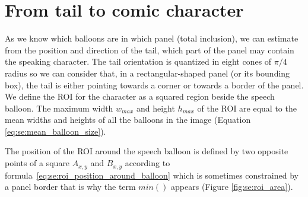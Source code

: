 


\section{From tail to comic character} %
\label{sec:se:tail_to_character}



As we know which balloons are in which panel (total inclusion), we can estimate from the position and direction of the tail, which part of the panel may contain the speaking character.
The tail orientation is quantized in eight cones of $\pi/4$ radius so we can consider that, in a rectangular-shaped panel (or its bounding box), the tail is either pointing towards a corner or towards a border of the panel.
We define the ROI for the character as a squared region beside the speech balloon.
The maximum width $w_{max}$ and height $h_{max}$ of the ROI are equal to the mean widths and heights of all the balloons in the image (Equation \ref{eq:se:mean_balloon_size}).

The position of the ROI around the speech balloon is defined by two opposite points of a square $A_{x,y}$ and $B_{x,y}$ according to formula~\ref{eq:se:roi_position_around_balloon} which is sometimes constrained by a panel border that is why the term $min()$ appears (Figure \ref{fig:se:roi_area}).

